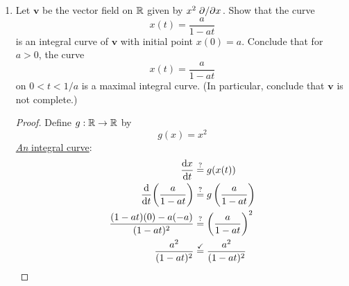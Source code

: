 \documentclass[../psets.tex]{subfiles}
\begin{document}
\begin{enumerate}[label={\textbf{2.2.\roman*.}}]
\begin{enumerate}
\begin{proof}
\begin{equation*}
            \end{equation*}
            Then we have the following.\par
            \underline{\emph{An} integral curve}:
            \begin{align*}
                \dv{\gamma}{t} &\stackrel{?}{=} g(\gamma(t))\\
                \left( \dv{t}(\e[t]a_1),\dots,\dv{t}(\e[t]a_n) \right) &\stackrel{?}{=} g(\e[t]a_1,\dots,\e[t]a_n)\\
                (\e[t]a_1,\dots,\e[t]a_n) &\stackrel{\checkmark}{=} (\e[t]a_1,\dots,\e[t]a_n)
            \end{align*}
            \underline{$\gamma(0)=a$}:
            \begin{align*}
                \gamma(0) &= \e[0](a_1,\dots,a_n)\\
                &= a
            \end{align*}
            \underline{\emph{Unique} integral curve}:
            Apply Theorem 2.2.5.
        \end{proof}
    \end{enumerate}
    \setcounter{enumi}{7}
    \item Let $\bm{v}$ be the vector field on $\mathbb{R}$ given by $x^2\pdv*{x}$. Show that the curve
    \begin{equation*}
        x(t) = \frac{a}{1-at}
    \end{equation*}
    is an integral curve of $\bm{v}$ with initial point $x(0)=a$. Conclude that for $a>0$, the curve
    \begin{equation*}
        x(t) = \frac{a}{1-at}
    \end{equation*}
    on $0<t<1/a$ is a maximal integral curve. (In particular, conclude that $\bm{v}$ is not complete.)
    \begin{proof}
        Define $g:\mathbb{R}\to\mathbb{R}$ by
        \begin{equation*}
            g(x) = x^2
        \end{equation*}
        \underline{\emph{An} integral curve}:
        \begin{align*}
            \dv{x}{t} &\stackrel{?}{=} g(x(t))\\
            \dv{t}(\frac{a}{1-at}) &\stackrel{?}{=} g\left( \frac{a}{1-at} \right)\\
            \frac{(1-at)(0)-a(-a)}{(1-at)^2} &\stackrel{?}{=} \left( \frac{a}{1-at} \right)^2\\
            \frac{a^2}{(1-at)^2} &\stackrel{\checkmark}{=} \frac{a^2}{(1-at)^2}

\end{align*}
\end{proof}
\end{enumerate}
\end{document}
